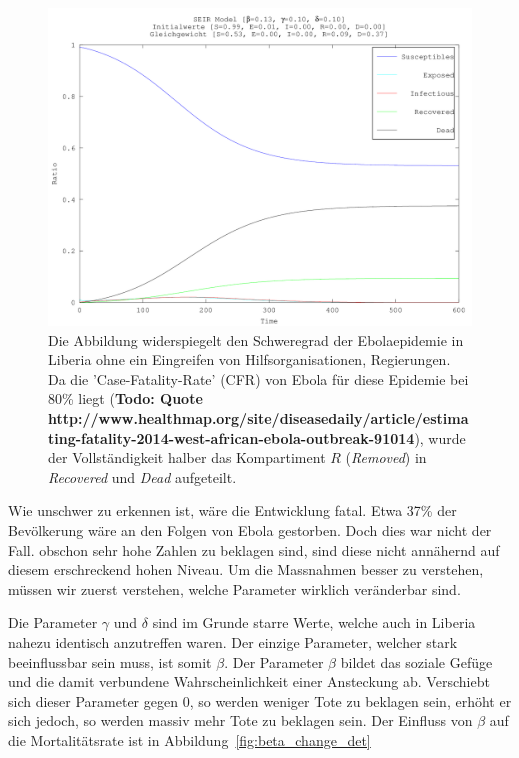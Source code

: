 \begin{refsection}
\begin{figure}[h]
	\centering
	\includegraphics[width=1\textwidth]{sir/ebola_outbreak.png}
  \caption[Ebola Ausbruch]{Die Abbildung widerspiegelt den Schweregrad der Ebolaepidemie in Liberia ohne ein Eingreifen von Hilfsorganisationen, Regierungen. Da die 'Case-Fatality-Rate' (CFR) von Ebola für diese Epidemie bei 80\% liegt (\textbf{Todo: Quote http://www.healthmap.org/site/diseasedaily/article/estimating-fatality-2014-west-african-ebola-outbreak-91014}), wurde der Vollständigkeit halber das Kompartiment $R$ (\emph{Removed}) in \emph{Recovered} und \emph{Dead} aufgeteilt.}
\end{figure}

Wie unschwer zu erkennen ist, wäre die Entwicklung fatal. Etwa 37\% der Bevölkerung wäre an den Folgen von Ebola gestorben. Doch dies war nicht der Fall. obschon sehr hohe Zahlen zu beklagen sind, sind diese nicht annähernd auf diesem erschreckend hohen Niveau. Um die Massnahmen besser zu verstehen, müssen wir zuerst verstehen, welche Parameter wirklich veränderbar sind.

Die Parameter $\gamma$ und $\delta$ sind im Grunde starre Werte, welche auch in Liberia nahezu identisch anzutreffen waren. Der einzige Parameter, welcher stark beeinflussbar sein muss, ist somit $\beta$. Der Parameter $\beta$ bildet das soziale Gefüge und die damit verbundene Wahrscheinlichkeit einer Ansteckung ab. Verschiebt sich dieser Parameter gegen 0, so werden weniger Tote zu beklagen sein, erhöht er sich jedoch, so werden massiv mehr Tote zu beklagen sein. Der Einfluss von $\beta$ auf die Mortalitätsrate ist in Abbildung~\ref{fig:beta_change_det}


\end{refsection}
